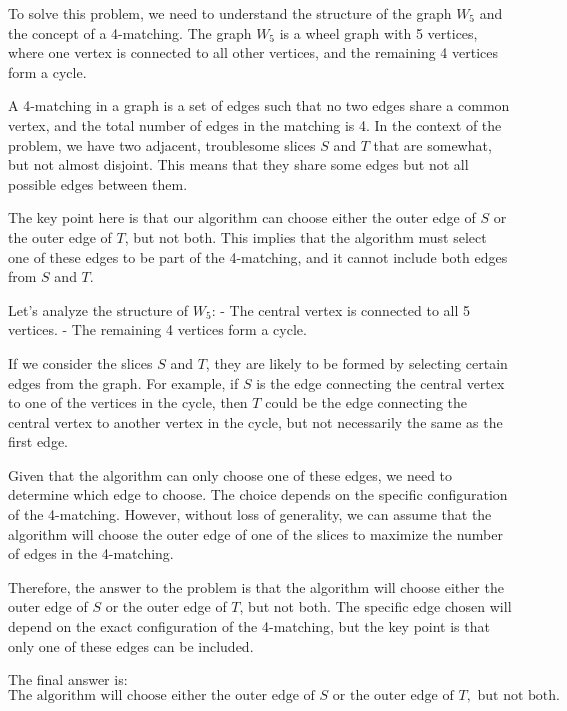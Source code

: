 To solve this problem, we need to understand the structure of the graph \( W_5 \) and the concept of a 4-matching. The graph \( W_5 \) is a wheel graph with 5 vertices, where one vertex is connected to all other vertices, and the remaining 4 vertices form a cycle.

A 4-matching in a graph is a set of edges such that no two edges share a common vertex, and the total number of edges in the matching is 4. In the context of the problem, we have two adjacent, troublesome slices \( S \) and \( T \) that are somewhat, but not almost disjoint. This means that they share some edges but not all possible edges between them.

The key point here is that our algorithm can choose either the outer edge of \( S \) or the outer edge of \( T \), but not both. This implies that the algorithm must select one of these edges to be part of the 4-matching, and it cannot include both edges from \( S \) and \( T \).

Let's analyze the structure of \( W_5 \):
- The central vertex is connected to all 5 vertices.
- The remaining 4 vertices form a cycle.

If we consider the slices \( S \) and \( T \), they are likely to be formed by selecting certain edges from the graph. For example, if \( S \) is the edge connecting the central vertex to one of the vertices in the cycle, then \( T \) could be the edge connecting the central vertex to another vertex in the cycle, but not necessarily the same as the first edge.

Given that the algorithm can only choose one of these edges, we need to determine which edge to choose. The choice depends on the specific configuration of the 4-matching. However, without loss of generality, we can assume that the algorithm will choose the outer edge of one of the slices to maximize the number of edges in the 4-matching.

Therefore, the answer to the problem is that the algorithm will choose either the outer edge of \( S \) or the outer edge of \( T \), but not both. The specific edge chosen will depend on the exact configuration of the 4-matching, but the key point is that only one of these edges can be included.

The final answer is:
\[
\boxed{\text{The algorithm will choose either the outer edge of } S \text{ or the outer edge of } T, \text{ but not both.}}
\]